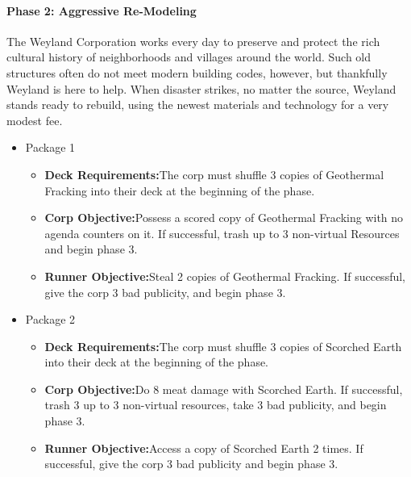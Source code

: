 \documentclass[titlepage]{article}
\begin{document}
			\paragraph{Phase 2: Aggressive Re-Modeling}

				The Weyland Corporation works every day to preserve and protect the rich cultural history of neighborhoods and villages around the world. Such old structures often do not meet modern building codes, however, but thankfully Weyland is here to help. When disaster strikes, no matter the source, Weyland stands ready to rebuild, using the newest materials and technology for a very modest fee.

				\begin{itemize}

					\item Package 1

						\begin{itemize}

							\item \textbf{Deck Requirements:}The corp must shuffle 3 copies of Geothermal Fracking into their deck at the beginning of the phase.

							\item \textbf{Corp Objective:}Possess a scored copy of Geothermal Fracking with no agenda counters on it. If successful, trash up to 3 non-virtual Resources and begin phase 3.

							\item \textbf{Runner Objective:}Steal 2 copies of Geothermal Fracking. If successful, give the corp 3 bad publicity, and begin phase 3.

						\end{itemize}
					\item Package 2

						\begin{itemize}

							\item \textbf{Deck Requirements:}The corp must shuffle 3 copies of Scorched Earth into their deck at the beginning of the phase.

							\item \textbf{Corp Objective:}Do 8 meat damage with Scorched Earth. If successful, trash 3 up to 3 non-virtual resources, take 3 bad publicity, and begin phase 3.

							\item \textbf{Runner Objective:}Access a copy of Scorched Earth 2 times. If successful, give the corp 3 bad publicity and begin phase 3.

						\end{itemize}

				\end{itemize}
\end{document}

